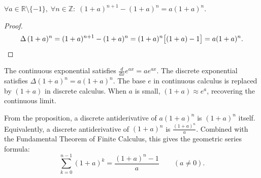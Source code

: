 \begin{remark*}
\(\forall a \in \mathbb{R}\setminus\{-1\},\; \forall n \in \mathbb{Z}:\;
(1+a)^{n+1} - (1+a)^n = a(1+a)^n\).
\end{remark*}

\begin{proof}
\[
\Delta\,(1+a)^n = (1+a)^{n+1} - (1+a)^n = (1+a)^n\bigl[(1+a)-1\bigr] = a(1+a)^n.
\qedhere
\]
\end{proof}

\begin{remark*}[Analogy]
The continuous exponential satisfies \(\tfrac{d}{dx}e^{ax} = ae^{ax}\).
The discrete exponential satisfies \(\Delta(1+a)^n = a(1+a)^n\). The
base \(e\) in continuous calculus is replaced by \((1+a)\) in discrete
calculus. When \(a\) is small, \((1+a) \approx e^a\), recovering the
continuous limit.
\end{remark*}

\begin{remark*}[Antiderivative]
From the proposition, a discrete antiderivative of \(a(1+a)^n\) is
\((1+a)^n\) itself. Equivalently, a discrete antiderivative of \((1+a)^n\)
is \(\tfrac{(1+a)^n}{a}\). Combined with the Fundamental Theorem of Finite
Calculus, this gives the geometric series formula:
\[
\sum_{k=0}^{n-1}(1+a)^k
= \frac{(1+a)^n - 1}{a}
\qquad (a \ne 0).
\]
\end{remark*}
